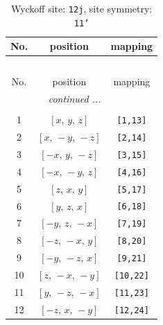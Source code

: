 \documentclass[fleqn,8pt]{jsarticle}
\begin{document}
\begin{longtable}{ccc}
\caption{Wyckoff site: {\tt 12j}, site symmetry: {\tt 11'}}
 \\
 \hline \hline
No. & position & mapping \\ \hline \endfirsthead

\multicolumn{2}{l}{\tablename\ \thetable{}} \\
 \hline \hline
No. & position & mapping \\ \hline \endhead

 \hline \hline
\multicolumn{2}{r}{\footnotesize\it continued ...} \\ \endfoot

 \hline \hline
\multicolumn{2}{r}{} \\ \endlastfoot

1 & $\left[ x,\, y,\, z \right]$ & {\tt [1,13]} \\ \hline
2 & $\left[ x,\, - y,\, - z \right]$ & {\tt [2,14]} \\ \hline
3 & $\left[ - x,\, y,\, - z \right]$ & {\tt [3,15]} \\ \hline
4 & $\left[ - x,\, - y,\, z \right]$ & {\tt [4,16]} \\ \hline
5 & $\left[ z,\, x,\, y \right]$ & {\tt [5,17]} \\ \hline
6 & $\left[ y,\, z,\, x \right]$ & {\tt [6,18]} \\ \hline
7 & $\left[ - y,\, z,\, - x \right]$ & {\tt [7,19]} \\ \hline
8 & $\left[ - z,\, - x,\, y \right]$ & {\tt [8,20]} \\ \hline
9 & $\left[ - y,\, - z,\, x \right]$ & {\tt [9,21]} \\ \hline
10 & $\left[ z,\, - x,\, - y \right]$ & {\tt [10,22]} \\ \hline
11 & $\left[ y,\, - z,\, - x \right]$ & {\tt [11,23]} \\ \hline
12 & $\left[ - z,\, x,\, - y \right]$ & {\tt [12,24]} \\
\end{longtable}
\end{document}
